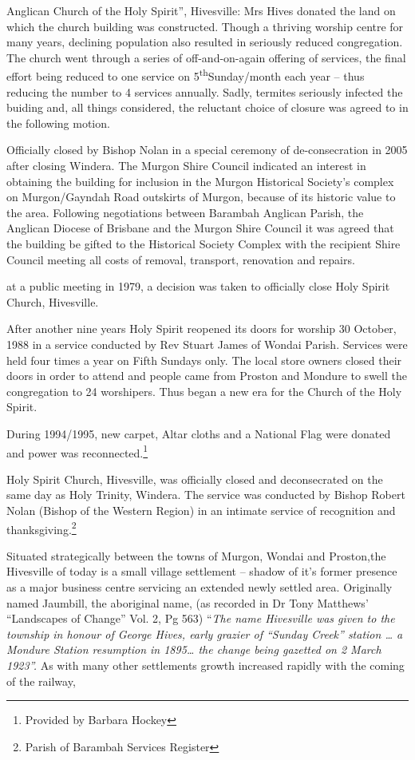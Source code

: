 Anglican Church of the Holy Spirit'', Hivesville: Mrs Hives donated the land on which the church building was constructed. Though a thriving worship centre for many years, declining population also resulted in seriously reduced congregation. The church went through a series of off-and-on-again offering of services, the final effort being reduced to one service on 5\textsuperscript{th}Sunday/month each year -- thus reducing the number to 4 services annually. Sadly, termites seriously infected the buiding and, all things considered, the reluctant choice of closure was agreed to in the following motion.

Officially closed by Bishop Nolan in a special ceremony of de-consecration in 2005 after closing Windera. The Murgon Shire Council indicated an interest in obtaining the building for inclusion in the Murgon Historical Society's complex on Murgon/Gayndah Road outskirts of Murgon, because of its historic value to the area. Following negotiations between Barambah Anglican Parish, the Anglican Diocese of Brisbane and the Murgon Shire Council it was agreed that the building be gifted to the Historical Society Complex with the recipient Shire Council meeting all costs of removal, transport, renovation and repairs.

at a public meeting in 1979, a decision was taken to officially close Holy Spirit Church, Hivesville.

After another nine years Holy Spirit reopened its doors for worship 30 October, 1988 in a service conducted by Rev Stuart James of Wondai Parish. Services were held four times a year on Fifth Sundays only. The local store owners closed their doors in order to attend and people came from Proston and Mondure to swell the congregation to 24 worshipers. Thus began a new era for the Church of the Holy Spirit.

During 1994/1995, new carpet, Altar cloths and a National Flag were donated and power was reconnected.\footnote{Provided by Barbara Hockey}

Holy Spirit Church, Hivesville, was officially closed and deconsecrated on the same day as Holy Trinity, Windera. The service was conducted by Bishop Robert Nolan (Bishop of the Western Region) in an intimate service of recognition and thanksgiving.\footnote{Parish of Barambah Services Register}

Situated strategically between the towns of Murgon, Wondai and Proston,the Hivesville of today is a small village settlement -- shadow of it's former presence as a major business centre servicing an extended newly settled area. Originally named Jaumbill, the aboriginal name, (as recorded in Dr Tony Matthews' ``Landscapes of Change'' Vol. 2, Pg 563) ``\emph{The name Hivesville was given to the township in honour of George Hives, early grazier of ``Sunday Creek'' station \ldots{} a Mondure Station resumption in 1895\ldots{} the change being gazetted on 2 March 1923''.} As with many other settlements growth increased rapidly with the coming of the railway,

